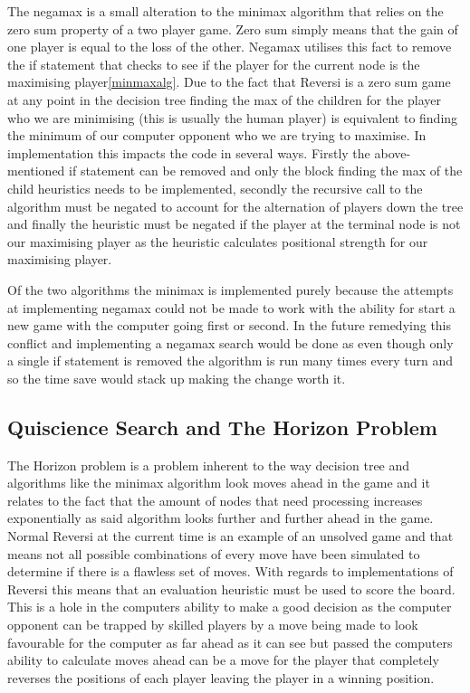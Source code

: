 \documentclass[final]{cmpreport}
\begin{document}
\FloatBarrier
The negamax is a small alteration to the minimax algorithm that relies on the zero sum property of a two player game. Zero sum simply means that the gain of one player is equal to the loss of the other. Negamax utilises this fact to remove the if statement that checks to see if the player for the current node is the maximising player\ref{minmaxalg}. Due to the fact that Reversi is a zero sum game at any point in the decision tree finding the max of the children for the player who we are minimising (this is usually the human player) is equivalent to finding the minimum of our computer opponent who we are trying to maximise. In implementation this impacts the code in several ways. Firstly the above-mentioned if statement can be removed and only the block finding the max of the child heuristics needs to be implemented, secondly the recursive call to the algorithm must be negated to account for the alternation of players down the tree and finally the heuristic must be negated if the player at the terminal node is not our maximising player as the heuristic calculates positional strength for our maximising player. 

Of the two algorithms the minimax is implemented purely because the attempts at implementing negamax could not be made to work with the ability for start a new game with the computer going first or second. In the future remedying this conflict and implementing a negamax search would be done as even though only a single if statement is removed the algorithm is run many times every turn and so the time save would stack up making the change worth it.

\subsection{Quiscience Search and The Horizon Problem}
The Horizon problem is a problem inherent to the way decision tree and algorithms like the minimax algorithm look moves ahead in the game and it relates to the fact that the amount of nodes that need processing increases exponentially as said algorithm looks further and further ahead in the game. Normal Reversi at the current time is an example of an unsolved game and that means not all possible combinations of every move have been simulated to determine if there is a flawless set of moves. With regards to implementations of Reversi this means that an evaluation heuristic must be used to score the board. This is a hole in the computers ability to make a good decision as the computer opponent can be trapped by skilled players by a move being made to look favourable for the computer as far ahead as it can see but passed the computers ability to calculate moves ahead can be a move for the player that completely reverses the positions of each player leaving the player in a winning position.
\end{document}
